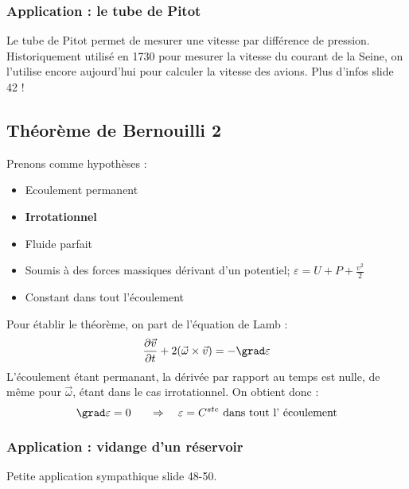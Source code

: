 \subsubsection{Application : le tube de Pitot}
Le tube de Pitot permet de mesurer une vitesse par différence de pression. 
Historiquement utilisé en 1730 pour mesurer la vitesse du courant de la Seine, 
on l'utilise encore aujourd'hui pour calculer la vitesse des avions. Plus d'infos
slide 42 !
		
	
\subsection{Théorème de Bernouilli 2}
Prenons comme hypothèses :
\begin{itemize}
	\item Ecoulement permanent
	\item \textbf{Irrotationnel}
	\item Fluide parfait
	\item Soumis à des forces massiques dérivant d'un potentiel; $\varepsilon = U + P + 
	      \frac{v^2}{2}$
	\item Constant dans tout l'écoulement
\end{itemize}
	
Pour établir le théorème, on part de l'équation de Lamb :
\begin{equation}
	\frac{\partial\vec v}{\partial t}+2(\vec{\omega}\times\vec{v}) = -\grad \varepsilon
\end{equation}
L'écoulement étant permanant, la dérivée par rapport au temps est nulle, de même pour
$\vec{\omega}$, étant dans le cas irrotationnel. On obtient donc :
\begin{equation}
	\grad \varepsilon = 0\ \ \ \ \ \Rightarrow\ \ \ \varepsilon = C^{ste}\ \text{dans tout l'
	écoulement}
\end{equation}
	
\subsubsection{Application : vidange d'un réservoir}
Petite application sympathique slide 48-50.
	
	
	

